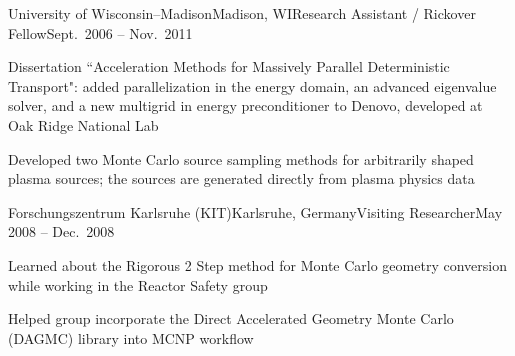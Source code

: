 \begin{rSubsection}{University of Wisconsin--Madison}{Madison, WI}{Research Assistant / Rickover Fellow}{Sept.\ 2006 -- Nov.\ 2011}
\item Dissertation ``Acceleration Methods for Massively Parallel Deterministic Transport": added parallelization in the energy domain, an advanced eigenvalue solver, and a new multigrid in energy preconditioner to Denovo, developed at Oak Ridge National Lab
\item Developed two Monte Carlo source sampling methods for arbitrarily shaped plasma sources; the sources are generated directly from plasma physics data
\end{rSubsection}




\begin{rSubsection}{Forschungszentrum Karlsruhe (KIT)}{Karlsruhe, Germany}{Visiting Researcher}{May 2008 -- Dec.\ 2008}
\item Learned about the Rigorous 2 Step method for Monte Carlo geometry conversion while working in the Reactor Safety group
\item Helped group incorporate the Direct Accelerated Geometry Monte Carlo (DAGMC) library into MCNP workflow
\end{rSubsection}



